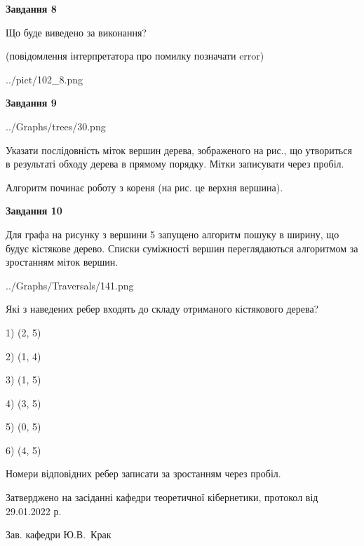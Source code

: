 \documentclass[12pt, ukrainian]{article}
\begin{document}
{\begin {large}
{\begin {center}\textbf{Завдання 8}\end {center}}\par
Що буде виведено за виконання?\par
 (повідомлення інтерпретатора про помилку позначати error)\par
\begin{center}
	{../pict/102_8.png}
\end{center}
\newpage

{\begin {center}\textbf{Завдання 9}\end {center}}\par

\begin{center}
	{../Graphs/trees/30.png}
\end{center}
Указати послідовність міток вершин дерева, зображеного на рис., що утвориться в результаті обходу дерева в прямому порядку. Мітки записувати через пробіл.\par Алгоритм починає роботу з кореня (на рис. це верхня вершина).\par
\newpage

{\begin {center}\textbf{Завдання 10}\end {center}}\par
Для графа на рисунку з вершини 5 запущено алгоритм пошуку в ширину, що будує кістякове дерево. Списки суміжності вершин переглядаються алгоритмом за зростанням міток вершин.\par
\begin{center}
	{../Graphs/Traversals/141.png}
\end{center}
\par Які з наведених ребер входять до складу отриманого кістякового дерева?\par
1) (2, 5)\par
2) (1, 4)\par
3) (1, 5)\par
4) (3, 5)\par
5) (0, 5)\par
6) (4, 5)\par
{\vskip 15pt} Номери відповідних ребер записати за зростанням через пробіл.\par
\newpage


\end {large}
}
{\smallskip \begin {small} Затверджено на засіданні кафедри теоретичної кібернетики, протокол  від   29.01.2022 р.\par\smallskip\smallskip
{\parbox {6.5 cm}{Зав. кафедри \dotfill Ю.В.~Крак}} \end{small}}
\end{document}
